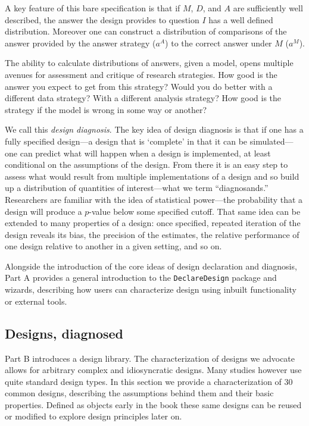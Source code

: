 \documentclass[11pt]{article}
\begin{document}
A key feature of this bare specification is that if $M$, $D$, and $A$ are sufficiently well described, the answer the design provides to question $I$ has a well defined distribution. Moreover  one can construct a distribution of comparisons of the answer provided by the answer strategy ($a^A$) to the correct answer under $M$ ($a^M$).

The ability to calculate distributions of answers, given a model, opens multiple avenues for assessment and critique of research strategies. How good is the answer you expect to get from this strategy? Would you do better with a different data strategy? With a different analysis strategy? How good is the strategy if the model is wrong in some way or another? 

We call this \textit{design diagnosis}. The key idea of design diagnosis is that if one has a fully specified design---a design that is `complete' in that it can be simulated---one can predict what will happen when a design is implemented, at least conditional on the assumptions of the design. From there it is an easy step to assess what would result from multiple implementations of a design and so build up a distribution of quantities of interest---what we term ``diagnosands.'' Researchers are familiar with the idea of statistical power---the probability that a design will produce a $p$-value below some specified cutoff. That same idea can be extended to many properties of a design: once specified, repeated iteration of the design reveals its bias, the precision of the estimates, the relative performance of one design relative to another in a given setting, and so on. 

Alongside the introduction of the core ideas of design declaration and diagnosis, Part A provides a general introduction to the \texttt{DeclareDesign} package and wizards, describing how users can characterize design using inbuilt functionality or external tools.


\subsection{Designs, diagnosed}

Part B introduces a design library. The characterization of designs we advocate allows for arbitrary complex and idiosyncratic designs. Many studies however use quite standard design types. In this section we provide a characterization of 30 common designs, describing the assumptions behind them and their basic properties. Defined as objects early in the book these same designs can be reused or modified to explore design principles later on. 
\end{document}

